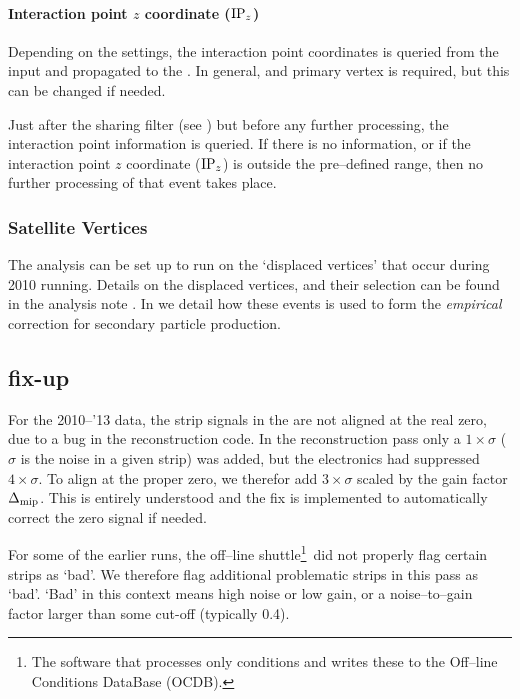 \paragraph{Interaction point $z$ coordinate ($\IPz$)} 
Depending on the settings, the interaction point coordinates is
queried from the input \ESD{} and propagated to the \AOD{}.  In
general, and \SPD{} primary vertex is required, but this can be
changed if needed. 

Just after the sharing filter (see )
but before any further processing, the interaction point information
is queried.  If there is no information, or if the interaction point
$z$ coordinate ($\IPz$) is outside the pre--defined range, then no
further processing of that event takes place.

\subsubsection{Satellite Vertices}
\label{sec:sub:sub:dispvtx}

The analysis can be set up to run on the `displaced vertices' that
occur during \LHC{} 2010 \PbPbCol{} running. Details on the displaced
vertices, and their selection can be found in the \VZERO{} analysis note
\cite{maxime}. In  we detail how these
events is used to form the \emph{empirical} correction for secondary
particle production.

\subsection{\ESD{} fix-up}
\label{sec:sub:fixer} 

For the 2010--'13 data, the \FMD{} strip signals in the \ESD{} are not
aligned at the real zero, due to a bug in the reconstruction code.  In
the reconstruction pass only a $1\times\sigma$ ($\sigma$ is the noise
in a given strip) was added, but the electronics had suppressed
$4\times\sigma$.  To align at the proper zero, we therefor add
$3\times\sigma$ scaled by the gain factor $\Delta_{\text{mip}}$.  This is
entirely understood and the fix is implemented to automatically
correct the zero signal if needed. 

For some of the earlier runs, the off--line shuttle\footnote{The
  software that processes only conditions and writes these to the
  Off--line Conditions DataBase (OCDB).}\ did not properly flag certain
strips as `bad'.  We therefore flag additional problematic strips in
this pass as `bad'.  `Bad' in this context means high noise or low
gain, or a noise--to--gain factor larger than some cut-off (typically
0.4). 

